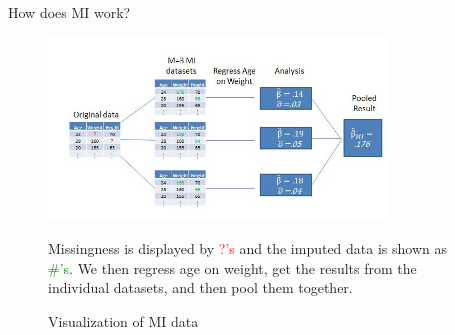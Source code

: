 \begin{frame}{How does MI work?}
 \begin{figure}[h!]
  \centering
    \includegraphics[width=0.8\textwidth]{mi_example_full.jpg}
  \caption{Visualization of MI data}
\label{fig:miexample}
\medskip
\small
Missingness is displayed by \textcolor{red}{?'s} and the imputed data is shown  as \textcolor{green}{\#'s}.
We then regress age on weight, get the results from the individual datasets, and then pool them together.
\end{figure}
\end{frame}

